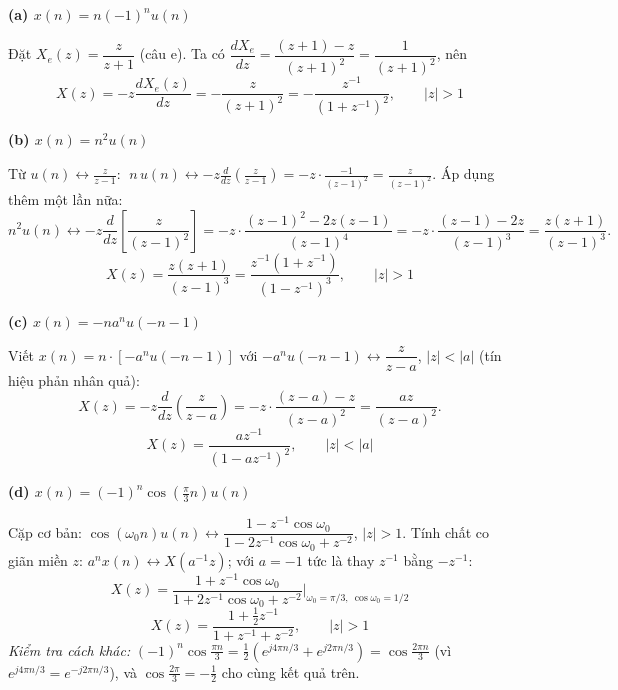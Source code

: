 \documentclass[12pt,a4paper]{article}
\begin{document}
\par\smallskip\noindent\textbf{(a) $x(n) = n(-1)^n u(n)$}\par
Đặt $X_e(z) = \dfrac{z}{z+1}$ (câu e). Ta có $\dfrac{dX_e}{dz} = \dfrac{(z+1) - z}{(z+1)^2} = \dfrac{1}{(z+1)^2}$, nên
\[
\boxed{\,X(z) = -z\frac{dX_e(z)}{dz} = -\frac{z}{(z+1)^2} = -\frac{z^{-1}}{(1+z^{-1})^2}, \qquad |z| > 1\,}
\]

\par\smallskip\noindent\textbf{(b) $x(n) = n^2 u(n)$}\par
Từ $u(n)\leftrightarrow \frac{z}{z-1}$: $\;n\,u(n) \leftrightarrow -z\frac{d}{dz}\left(\frac{z}{z-1}\right) = -z\cdot\frac{-1}{(z-1)^2} = \frac{z}{(z-1)^2}$. Áp dụng thêm một lần nữa:
\[
n^2u(n) \leftrightarrow -z\frac{d}{dz}\left[\frac{z}{(z-1)^2}\right]
 = -z\cdot\frac{(z-1)^2 - 2z(z-1)}{(z-1)^4}
 = -z\cdot\frac{(z-1)-2z}{(z-1)^3} = \frac{z(z+1)}{(z-1)^3}.
\]
\[
\boxed{\,X(z) = \frac{z(z+1)}{(z-1)^3} = \frac{z^{-1}(1+z^{-1})}{(1-z^{-1})^3}, \qquad |z| > 1\,}
\]

\par\smallskip\noindent\textbf{(c) $x(n) = -n a^n u(-n-1)$}\par
Viết $x(n) = n\cdot\left[-a^nu(-n-1)\right]$ với $-a^nu(-n-1)\leftrightarrow \dfrac{z}{z-a}$, $|z|<|a|$ (tín hiệu phản nhân quả):
\[
X(z) = -z\frac{d}{dz}\left(\frac{z}{z-a}\right) = -z\cdot\frac{(z-a)-z}{(z-a)^2} = \frac{az}{(z-a)^2}.
\]
\[
\boxed{\,X(z) = \frac{az^{-1}}{(1-az^{-1})^2}, \qquad |z| < |a|\,}
\]

\par\smallskip\noindent\textbf{(d) $x(n) = (-1)^n\cos\left(\frac{\pi}{3}n\right)u(n)$}\par
Cặp cơ bản: $\cos(\omega_0 n)u(n) \leftrightarrow \dfrac{1 - z^{-1}\cos\omega_0}{1 - 2z^{-1}\cos\omega_0 + z^{-2}}$, $|z|>1$.
Tính chất co giãn miền $z$: $a^n x(n) \leftrightarrow X(a^{-1}z)$; với $a=-1$ tức là thay $z^{-1}$ bằng $-z^{-1}$:
\[
X(z) = \frac{1 + z^{-1}\cos\omega_0}{1 + 2z^{-1}\cos\omega_0 + z^{-2}}\Bigg|_{\omega_0 = \pi/3,\ \cos\omega_0 = 1/2}
\]
\[
\boxed{\,X(z) = \frac{1 + \frac{1}{2}z^{-1}}{1 + z^{-1} + z^{-2}}, \qquad |z| > 1\,}
\]
\textit{Kiểm tra cách khác:} $(-1)^n\cos\frac{\pi n}{3} = \frac{1}{2}\left(e^{j4\pi n/3} + e^{j2\pi n/3}\right) = \cos\frac{2\pi n}{3}$ (vì $e^{j4\pi n/3} = e^{-j2\pi n/3}$), và $\cos\frac{2\pi}{3} = -\frac12$ cho cùng kết quả trên.
\end{document}
